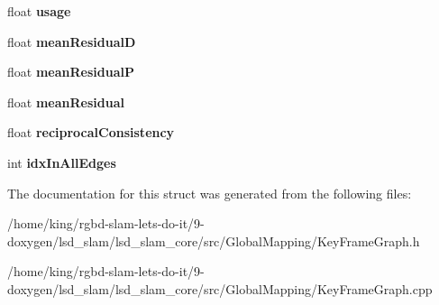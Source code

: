 \begin{DoxyCompactItemize}
\item 
\hypertarget{structlsd__slam_1_1_k_f_constraint_struct_a4733c48b4b01efa316fe343983079b36}{float {\bfseries usage}}\label{structlsd__slam_1_1_k_f_constraint_struct_a4733c48b4b01efa316fe343983079b36}

\item 
\hypertarget{structlsd__slam_1_1_k_f_constraint_struct_a56d3514b0a01ff5968a9b1a5ccc1beaf}{float {\bfseries mean\-Residual\-D}}\label{structlsd__slam_1_1_k_f_constraint_struct_a56d3514b0a01ff5968a9b1a5ccc1beaf}

\item 
\hypertarget{structlsd__slam_1_1_k_f_constraint_struct_a68a32baf3e42ba069b601a4556438d98}{float {\bfseries mean\-Residual\-P}}\label{structlsd__slam_1_1_k_f_constraint_struct_a68a32baf3e42ba069b601a4556438d98}

\item 
\hypertarget{structlsd__slam_1_1_k_f_constraint_struct_acd1814fc35a44c58779184f2950e7658}{float {\bfseries mean\-Residual}}\label{structlsd__slam_1_1_k_f_constraint_struct_acd1814fc35a44c58779184f2950e7658}

\item 
\hypertarget{structlsd__slam_1_1_k_f_constraint_struct_ab34a87d36118a5d15d4c88a0f280ce86}{float {\bfseries reciprocal\-Consistency}}\label{structlsd__slam_1_1_k_f_constraint_struct_ab34a87d36118a5d15d4c88a0f280ce86}

\item 
\hypertarget{structlsd__slam_1_1_k_f_constraint_struct_ab8e306aca770595b3ab5dc6cb84f53c5}{int {\bfseries idx\-In\-All\-Edges}}\label{structlsd__slam_1_1_k_f_constraint_struct_ab8e306aca770595b3ab5dc6cb84f53c5}

\end{DoxyCompactItemize}


The documentation for this struct was generated from the following files\-:\begin{DoxyCompactItemize}
\item 
/home/king/rgbd-\/slam-\/lets-\/do-\/it/9-\/doxygen/lsd\-\_\-slam/lsd\-\_\-slam\-\_\-core/src/\-Global\-Mapping/Key\-Frame\-Graph.\-h\item 
/home/king/rgbd-\/slam-\/lets-\/do-\/it/9-\/doxygen/lsd\-\_\-slam/lsd\-\_\-slam\-\_\-core/src/\-Global\-Mapping/Key\-Frame\-Graph.\-cpp\end{DoxyCompactItemize}

